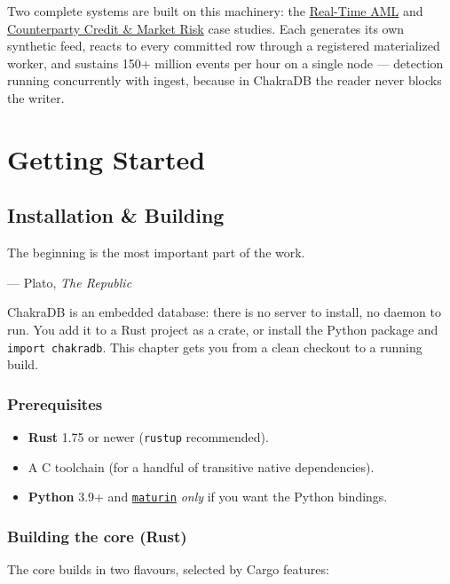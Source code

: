 \documentclass[
  11pt,
  openany]{book}
\providecommand{\tightlist}{%
  \setlength{\itemsep}{0pt}\setlength{\parskip}{0pt}}
\begin{document}
Two complete systems are built on this machinery: the
\href{../case-studies/aml.md}{Real-Time AML} and
\href{../case-studies/ccr.md}{Counterparty Credit \& Market Risk} case
studies. Each generates its own synthetic feed, reacts to every
committed row through a registered materialized worker, and sustains
150+ million events per hour on a single node --- detection running
concurrently with ingest, because in ChakraDB the reader never blocks
the writer.

\part{Getting Started}

\chapter{Installation \& Building}\label{installation-building}

\epigraph{The beginning is the most important part of the work.}{--- Plato, \emph{The Republic}}

ChakraDB is an embedded database: there is no server to install, no
daemon to run. You add it to a Rust project as a crate, or install the
Python package and \texttt{import\ chakradb}. This chapter gets you from
a clean checkout to a running build.

\section{Prerequisites}\label{prerequisites}

\begin{itemize}
\tightlist
\item
  \textbf{Rust} 1.75 or newer (\texttt{rustup} recommended).
\item
  A C toolchain (for a handful of transitive native dependencies).
\item
  \textbf{Python} 3.9+ and
  \href{https://www.maturin.rs/}{\texttt{maturin}} \emph{only} if you
  want the Python bindings.
\end{itemize}

\section{Building the core (Rust)}\label{building-the-core-rust}

The core builds in two flavours, selected by Cargo features:
\end{document}
